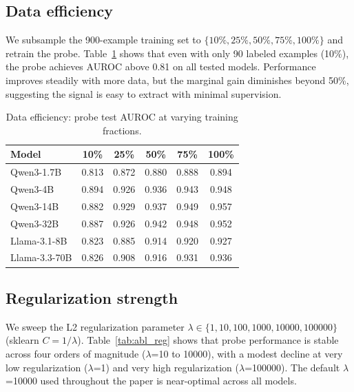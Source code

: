 \subsection{Data efficiency}
\label{app:ablation_data}

We subsample the 900-example training set to $\{10\%, 25\%, 50\%, 75\%, 100\%\}$ and retrain the probe. Table~\ref{tab:abl_data} shows that even with only 90 labeled examples (10\%), the probe achieves AUROC above 0.81 on all tested models. Performance improves steadily with more data, but the marginal gain diminishes beyond 50\%, suggesting the signal is easy to extract with minimal supervision.

\begin{table}[H]
\caption{Data efficiency: probe test AUROC at varying training fractions.}
\label{tab:abl_data}
\centering
\small
\begin{tabular}{lccccc}
\toprule
Model & 10\% & 25\% & 50\% & 75\% & 100\% \\
\midrule
Qwen3-1.7B      & 0.813 & 0.872 & 0.880 & 0.888 & 0.894 \\
Qwen3-4B        & 0.894 & 0.926 & 0.936 & 0.943 & 0.948 \\
Qwen3-14B       & 0.882 & 0.929 & 0.937 & 0.949 & 0.957 \\
Qwen3-32B       & 0.887 & 0.926 & 0.942 & 0.948 & 0.952 \\
Llama-3.1-8B    & 0.823 & 0.885 & 0.914 & 0.920 & 0.927 \\
Llama-3.3-70B   & 0.826 & 0.908 & 0.916 & 0.931 & 0.936 \\
\bottomrule
\end{tabular}
\end{table}

\subsection{Regularization strength}
\label{app:ablation_reg}

We sweep the L2 regularization parameter $\lambda \in \{1, 10, 100, 1000, 10000, 100000\}$ (sklearn $C = 1/\lambda$). Table~\ref{tab:abl_reg} shows that probe performance is stable across four orders of magnitude ($\lambda$=10 to 10000), with a modest decline at very low regularization ($\lambda$=1) and very high regularization ($\lambda$=100000). The default $\lambda$=10000 used throughout the paper is near-optimal across all models.

